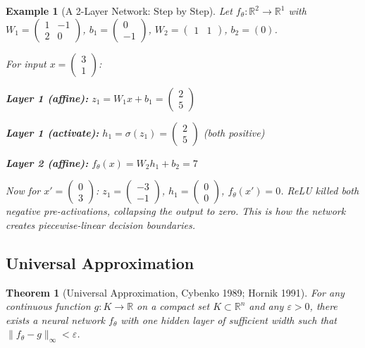 \documentclass[10pt,twocolumn]{article}
\newtheorem{theorem}[definition]{Theorem}
\newtheorem{example}[definition]{Example}
\begin{document}
\begin{example}[A 2-Layer Network: Step by Step]\label{ex:2layer}
Let $f_\theta: \mathbb{R}^2 \to \mathbb{R}^1$ with $W_1 = \begin{pmatrix} 1 & -1 \\ 2 & 0 \end{pmatrix}$, $b_1 = \begin{pmatrix} 0 \\ -1 \end{pmatrix}$, $W_2 = \begin{pmatrix} 1 & 1 \end{pmatrix}$, $b_2 = (0)$.

For input $x = \begin{pmatrix} 3 \\ 1 \end{pmatrix}$:

\textbf{Layer 1 (affine):} $z_1 = W_1 x + b_1 = \begin{pmatrix} 2 \\ 5 \end{pmatrix}$

\textbf{Layer 1 (activate):} $h_1 = \sigma(z_1) = \begin{pmatrix} 2 \\ 5 \end{pmatrix}$ (both positive)

\textbf{Layer 2 (affine):} $f_\theta(x) = W_2 h_1 + b_2 = 7$

Now for $x' = \begin{pmatrix} 0 \\ 3 \end{pmatrix}$: $z_1 = \begin{pmatrix} -3 \\ -1 \end{pmatrix}$, $h_1 = \begin{pmatrix} 0 \\ 0 \end{pmatrix}$, $f_\theta(x') = 0$. ReLU killed both negative pre-activations, collapsing the output to zero. This is how the network creates piecewise-linear decision boundaries.
\end{example}

\subsection{Universal Approximation}

\begin{theorem}[Universal Approximation, Cybenko 1989; Hornik 1991]
For any continuous function $g: K \to \mathbb{R}$ on a compact set $K \subset \mathbb{R}^n$ and any $\varepsilon > 0$, there exists a neural network $f_\theta$ with one hidden layer of sufficient width such that $\|f_\theta - g\|_\infty < \varepsilon$.
\end{theorem}
\end{document}
